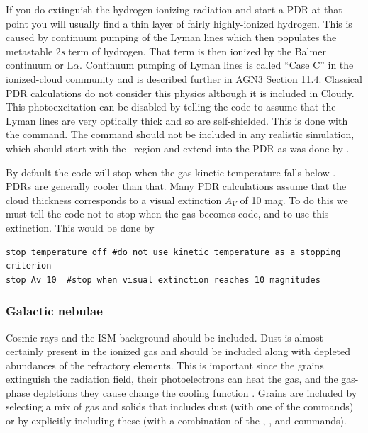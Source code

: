 \documentclass[12pt,twoside]{article}
\begin{document}
{If you do extinguish the hydrogen-ionizing radiation and start a PDR
at that point you will usually find a thin layer of fairly highly-ionized
hydrogen.  This is caused by continuum pumping of the Lyman lines which
then populates the metastable 2\emph{s} term of hydrogen.
That term is then
ionized by the Balmer continuum or $\mathrm{L}\alpha$.
Continuum pumping of Lyman lines
is called ``Case C'' in the ionized-cloud community
\citep{FerlandCaseC99} and is described further in AGN3 Section 11.4.
Classical PDR calculations
do not consider this physics although it is included in Cloudy.
This photoexcitation can be disabled by telling the code
to assume that the Lyman lines are very optically thick
and so are self-shielded.
This is done with
the  command.
The  command should
not be included in any realistic simulation, which should start with the
\hplus\ region and extend into the PDR as was done by
\citet{Abel2005}.

By default the code will stop when the gas kinetic temperature 
falls below \TEMPSTOPDEFAULT.
PDRs are generally cooler than that.
Many PDR calculations assume that the cloud thickness corresponds
to a visual extinction $A_V$ of 10 mag.
To do this we must tell the code not to stop when the gas becomes
code, and to use this extinction.  This would be done by
\begin{verbatim}
stop temperature off #do not use kinetic temperature as a stopping criterion
stop Av 10  #stop when visual extinction reaches 10 magnitudes
\end{verbatim}

\subsubsection{Galactic nebulae}

Cosmic rays and the ISM background should be included.  Dust is almost
certainly present in the ionized gas and should be included along with
depleted abundances of the refractory elements.
This is important since
the grains extinguish the radiation field, their photoelectrons can heat
the gas, and the gas-phase depletions they cause change
the cooling function \citep{KingdonEtAlGrainEffects95}.
Grains are included by selecting a mix of gas and solids that
includes dust (with one of the  commands) or by explicitly
including these (with a combination of the ,
, and  commands).

}
\end{document}

